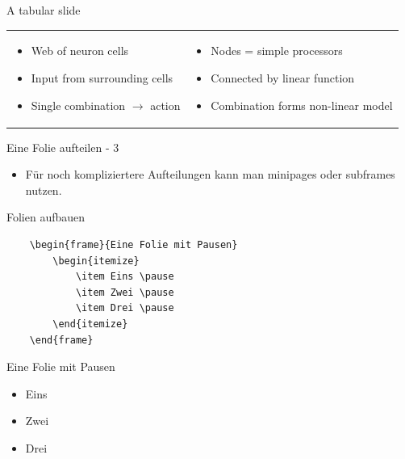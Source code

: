 \documentclass{beamer}
\begin{document}
\begin{frame}{A tabular slide}
\begin{tabular}{p{5cm}|p{5cm}}
\begin{itemize}
            \item Web of neuron cells
            \item Input from surrounding cells
            \item Single combination $\rightarrow$ action
        \end{itemize}
        & 
        \begin{itemize}
          \item Nodes = simple processors
          \item Connected by linear function
          \item Combination forms non-linear model
        \end{itemize} 
     \end{tabular}
    \end{frame}


\begin{frame}[containsverbatim]{Eine Folie aufteilen - 3}
    \begin{itemize}
        \item Für noch kompliziertere Aufteilungen kann man minipages oder subframes nutzen.
    \end{itemize}
\end{frame}



\begin{frame}[containsverbatim]{Folien aufbauen}
    \begin{lstlisting}
    \begin{frame}{Eine Folie mit Pausen}
        \begin{itemize}
            \item Eins \pause
            \item Zwei \pause
            \item Drei \pause
        \end{itemize}
    \end{frame}
    \end{lstlisting}
\end{frame}

\begin{frame}{Eine Folie mit Pausen}
    \begin{itemize}
        \item Eins \pause
        \item Zwei \pause
        \item Drei 
    \end{itemize}
\end{frame}
\end{document}
